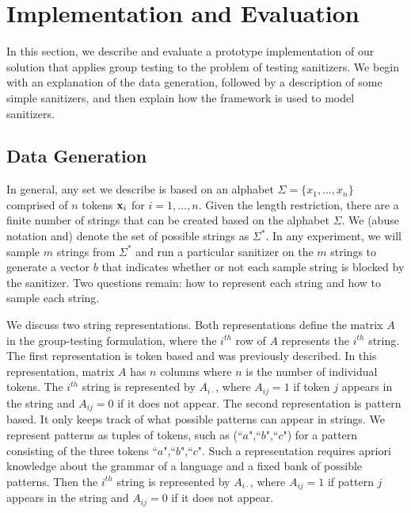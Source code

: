 \section{Implementation and Evaluation}
In this section, we describe and evaluate a prototype implementation of our solution that applies group testing to the problem of testing sanitizers. We begin with an explanation of the data generation, followed by a description of some simple sanitizers, and then explain how the framework is used to model sanitizers.

\subsection{Data Generation}
In general, any set we describe is based on an alphabet $\Sigma=\{x_1,\ldots,x_n\}$ comprised of $n$ tokens $\mathbf{x}_i$ for $i=1,\ldots,n$. Given the length restriction, there are a finite number of strings that can be created based on the alphabet $\Sigma$. We (abuse notation and) denote the set of possible strings as $\Sigma^*$. In any experiment, we will sample $m$ strings from $\Sigma^*$ and run a particular sanitizer on the $m$ strings to generate a vector $b$ that indicates whether or not each sample string is blocked by the sanitizer. Two questions remain: how to represent each string and how to sample each string. 

We discuss two string representations. Both representations define the matrix $A$ in the group-testing formulation, where the $i^{th}$ row of $A$ represents the $i^{th}$ string. The first representation is token based and was previously described. In this representation, matrix $A$ has $n$ columns where $n$ is the number of individual tokens. The $i^{th}$ string is represented by $A_{i\cdot}$, where $A_{ij}=1$ if token $j$ appears in the string and $A_{ij}=0$ if it does not appear. The second representation is pattern based. It only keeps track of what possible patterns can appear in strings. We represent patterns as tuples of tokens, such as (``$a$",``$b$",``$c$") for a pattern consisting of the three tokens ``$a$",``$b$",``$c$". Such a representation requires apriori knowledge about the grammar of a language and a fixed bank of possible patterns. Then the $i^{th}$ string is represented by $A_{i\cdot}$, where $A_{ij}=1$ if pattern $j$ appears in the string and $A_{ij}=0$ if it does not appear.

